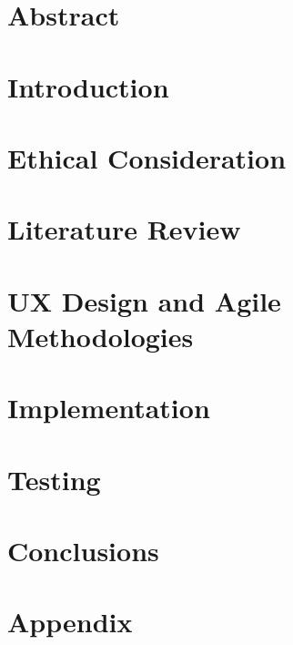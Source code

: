 \documentclass[oneside,openright,titlepage,numbers=noenddot,headinclude,footinclude=true,cleardoublepage=empty,listof=totoc,paper=a4,fontsize=11pt,english,BCOR=5mm]{scrreprt}
\begin{document}
  \frenchspacing
  \raggedbottom

  \pagestyle{plain}

  \singlespacing
  
  

  \onehalfspacing
  

  \chapter*{Abstract}
  

  

  \cleardoublepage
  \pagestyle{scrheadings}
  \onehalfspacing

  \chapter{Introduction}\label{c:Introduction}
  

  \chapter{Ethical Consideration}\label{c:Ethical-Consideration}
  

  \chapter{Literature Review}\label{c:Literature-Review}
  

  \chapter{UX Design and Agile Methodologies}\label{c:UX-Design-Agile-Methodologies}
  

  \chapter{Implementation}\label{c:Implementation}
  

  \chapter{Testing}\label{c:Testing}
  

  \chapter{Conclusions}\label{c:Conclusions}
  

  \cleardoublepage
  \appendix

  \singlespacing
  
  \chapter{Appendix}\label{c:Appendix}
  
  \cleardoublepage
\end{document}
